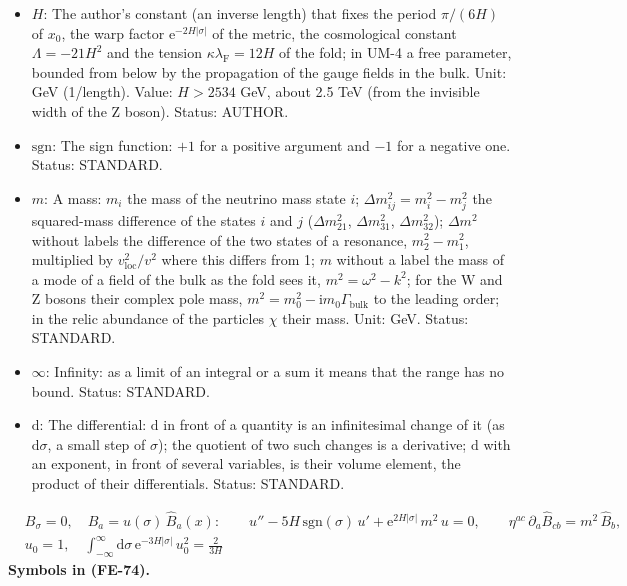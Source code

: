 \documentclass[
  10pt,
]{article}
\begin{document}
\begin{itemize}
  respect to \(x_4\) (\(a_4' = \mathrm{d}a_4/\mathrm{d}x_4\); two primes
  the second derivative); on a function of \(\sigma\) alone (a profile)
  the derivative with respect to \(\sigma\). Status: STANDARD.
\item
  \(H\): The author's constant (an inverse length) that fixes the period
  \(\pi/(6H)\) of \(x_0\), the warp factor
  \(\mathrm{e}^{-2H\lvert\sigma\rvert}\) of the metric, the cosmological
  constant \(\Lambda = -21H^2\) and the tension
  \(\kappa\lambda_{\mathrm{F}} = 12H\) of the fold; in UM-4 a free
  parameter, bounded from below by the propagation of the gauge fields
  in the bulk. Unit: GeV (1/length). Value: \(H > 2534\) GeV, about 2.5
  TeV (from the invisible width of the Z boson). Status: AUTHOR.
\item
  \(\mathrm{sgn}\): The sign function: \(+1\) for a positive argument
  and \(-1\) for a negative one. Status: STANDARD.
\item
  \(m\): A mass: \(m_i\) the mass of the neutrino mass state \(i\);
  \(\Delta m_{ij}^2 = m_i^2 - m_j^2\) the squared-mass difference of the
  states \(i\) and \(j\) (\(\Delta m_{21}^2\), \(\Delta m_{31}^2\),
  \(\Delta m_{32}^2\)); \(\Delta m^2\) without labels the difference of
  the two states of a resonance, \(m_2^2 - m_1^2\), multiplied by
  \(v_{\mathrm{loc}}^2/v^2\) where this differs from 1; \(m\) without a
  label the mass of a mode of a field of the bulk as the fold sees it,
  \(m^2 = \omega^2 - k^2\); for the W and Z bosons their complex pole
  mass, \(m^2 = m_0^2 - \mathrm{i}m_0\Gamma_{\mathrm{bulk}}\) to the
  leading order; in the relic abundance of the particles \(\chi\) their
  mass. Unit: GeV. Status: STANDARD.
\item
  \(\infty\): Infinity: as a limit of an integral or a sum it means that
  the range has no bound. Status: STANDARD.
\item
  \(\mathrm{d}\): The differential: \(\mathrm{d}\) in front of a
  quantity is an infinitesimal change of it (as \(\mathrm{d}\sigma\), a
  small step of \(\sigma\)); the quotient of two such changes is a
  derivative; \(\mathrm{d}\) with an exponent, in front of several
  variables, is their volume element, the product of their
  differentials. Status: STANDARD.
\end{itemize}

\[
\begin{aligned}
&B_\sigma = 0,\quad B_a = u(\sigma)\,\hat B_a(x):\qquad
u'' - 5H\,\mathrm{sgn}(\sigma)\,u' + \mathrm{e}^{2H\lvert\sigma\rvert}\,m^2\,u = 0,\qquad
\eta^{ac}\,\partial_a\hat B_{cb} = m^2\,\hat B_b,\\
&u_0 = 1,\quad \int_{-\infty}^{\infty}\mathrm{d}\sigma\,\mathrm{e}^{-3H\lvert\sigma\rvert}\,u_0^2 = \frac{2}{3H}
\end{aligned} \tag{FE-74}
\] \textbf{Symbols in (FE-74).}
\end{document}

